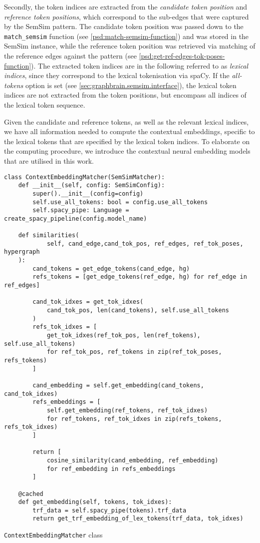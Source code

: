 \documentclass[11pt, numbers=noenddot]{scrreprt}
\begin{document}
Secondly, the token indices are extracted from the \textit{candidate token position} and \textit{reference token positions}, which correspond to the sub-edges that were captured by the SemSim pattern. The candidate token position was passed down to the \texttt{match\_semsim} function (see \cref{psd:match-semsim-function}) and was stored in the SemSim instance, while the reference token position was retrieved via matching of the reference edges against the pattern (see \cref{psd:get-ref-edges-tok-poses-function}). The extracted token indices are in the following referred to as \textit{lexical indices}, since they correspond to the lexical tokenisation via spaCy. If the \textit{all-tokens} option is set (see \cref{sec:graphbrain.semsim.interface}), the lexical token indices are not extracted from the token positions, but encompass all indices of the lexical token sequence.

Given the candidate and reference tokens, as well as the relevant lexical indices, we have all information needed to compute the contextual embeddings, specific to the lexical tokens that are specified by the lexical token indices. To elaborate on the computing procedure, we introduce the contextual neural embedding models that are utilised in this work.

\begin{pseudo}[p!]
\begin{lstlisting}
class ContextEmbeddingMatcher(SemSimMatcher):
    def __init__(self, config: SemSimConfig):
        super().__init__(config=config)
        self.use_all_tokens: bool = config.use_all_tokens
        self.spacy_pipe: Language = create_spacy_pipeline(config.model_name)

    def similarities(
            self, cand_edge,cand_tok_pos, ref_edges, ref_tok_poses, hypergraph
    ):
        cand_tokens = get_edge_tokens(cand_edge, hg)
        refs_tokens = [get_edge_tokens(ref_edge, hg) for ref_edge in ref_edges]

        cand_tok_idxes = get_tok_idxes(
            cand_tok_pos, len(cand_tokens), self.use_all_tokens
        )
        refs_tok_idxes = [
            get_tok_idxes(ref_tok_pos, len(ref_tokens), self.use_all_tokens)
            for ref_tok_pos, ref_tokens in zip(ref_tok_poses, refs_tokens)
        ]
        
        cand_embedding = self.get_embedding(cand_tokens, cand_tok_idxes)
        refs_embeddings = [
            self.get_embedding(ref_tokens, ref_tok_idxes)
            for ref_tokens, ref_tok_idxes in zip(refs_tokens, refs_tok_idxes)
        ]
        
        return [
            cosine_similarity(cand_embedding, ref_embedding)
            for ref_embedding in refs_embeddings
        ]

    @cached
    def get_embedding(self, tokens, tok_idxes):
        trf_data = self.spacy_pipe(tokens).trf_data
        return get_trf_embedding_of_lex_tokens(trf_data, tok_idxes)
\end{lstlisting}
\caption{\texttt{ContextEmbeddingMatcher} class}
\label{psd:contextualmatcher-class}
\end{pseudo}
\end{document}
